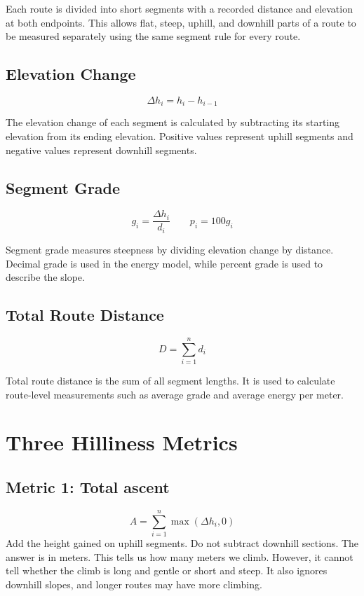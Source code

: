 \documentclass[11pt,letterpaper]{article}
\begin{document}
Each route is divided into short segments with a recorded distance and elevation at both endpoints. This allows flat, steep, uphill, and downhill parts of a route to be measured separately using the same segment rule for every route.

\subsection{Elevation Change}
\begin{equation}
\boxed{\Delta h_i=h_i-h_{i-1}}
\end{equation}

The elevation change of each segment is calculated by subtracting its starting elevation from its ending elevation. Positive values represent uphill segments and negative values represent downhill segments.

\subsection{Segment Grade}
\begin{equation}
\boxed{g_i=\frac{\Delta h_i}{d_i}}
\qquad
\boxed{p_i=100g_i}
\end{equation}

Segment grade measures steepness by dividing elevation change by distance. Decimal grade is used in the energy model, while percent grade is used to describe the slope.

\subsection{Total Route Distance}
\begin{equation}
\boxed{D=\sum_{i=1}^{n}d_i}
\end{equation}

Total route distance is the sum of all segment lengths. It is used to calculate route-level measurements such as average grade and average energy per meter.
\section{Three Hilliness Metrics}
\subsection{Metric 1: Total ascent}
\begin{equation}\boxed{A=\sum_{i=1}^{n}\max(\Delta h_i,0)}\end{equation}
Add the height gained on uphill segments. Do not subtract downhill sections. The answer is in meters. This tells us how many meters we climb. However, it cannot tell whether the climb is long and gentle or short and steep. It also ignores downhill slopes, and longer routes may have more climbing.
\end{document}
